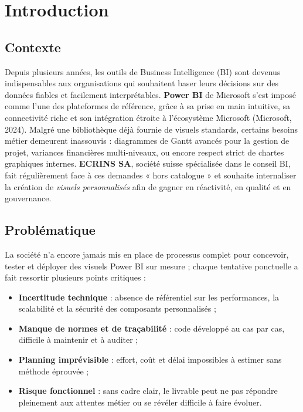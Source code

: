 \chapter{Introduction}
\setlength{\parindent}{0pt}      %

\minitoc                         %

\section{Contexte}

Depuis plusieurs années, les outils de Business Intelligence (BI) sont devenus indispensables aux organisations qui souhaitent baser leurs décisions sur des données fiables et facilement interprétables. \textbf{Power BI} de Microsoft s’est imposé comme l’une des plateformes de référence, grâce à sa prise en main intuitive, sa connectivité riche et son intégration étroite à l’écosystème Microsoft (Microsoft, 2024).  
Malgré une bibliothèque déjà fournie de visuels standards, certains besoins métier demeurent inassouvis : diagrammes de Gantt avancés pour la gestion de projet, variances financières multi-niveaux, ou encore respect strict de chartes graphiques internes.  
\textbf{ECRINS SA}, société suisse spécialisée dans le conseil BI, fait régulièrement face à ces demandes « hors catalogue » et souhaite internaliser la création de \emph{visuels personnalisés} afin de gagner en réactivité, en qualité et en gouvernance.

\section{Problématique}

La société n’a encore jamais mis en place de processus complet pour concevoir, tester et déployer des visuels Power BI sur mesure ; chaque tentative ponctuelle a fait ressortir plusieurs points critiques :

\begin{itemize}
  \item \textbf{Incertitude technique} : absence de référentiel sur les performances, la scalabilité et la sécurité des composants personnalisés ;
  \item \textbf{Manque de normes et de traçabilité} : code développé au cas par cas, difficile à maintenir et à auditer ;
  \item \textbf{Planning imprévisible} : effort, coût et délai impossibles à estimer sans méthode éprouvée ;
  \item \textbf{Risque fonctionnel} : sans cadre clair, le livrable peut ne pas répondre pleinement aux attentes métier ou se révéler difficile à faire évoluer.
\end{itemize}

